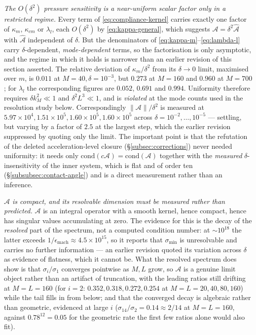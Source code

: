 \emph{The $O(\delta^2)$ pressure sensitivity is a near-uniform scalar factor only in a restricted regime.} Every term of \eqref{eq:compliance-kernel} carries exactly one factor of $\kappa_m$, $\kappa_{cm}$ or $\lambda_l$, each $O(\delta^2)$ by \eqref{eq:kappa-general}, which suggests $\mathcal A=\delta^2\widehat{\mathcal A}$ with $\widehat{\mathcal A}$ independent of $\delta$. But the denominators of \eqref{eq:kappa-m}--\eqref{eq:lambda-l} carry $\delta$-dependent, \emph{mode-dependent} terms, so the factorisation is only asymptotic, and the regime in which it holds is narrower than an earlier revision of this section asserted. The relative deviation of $\kappa_m/\delta^2$ from its $\delta\to0$ limit, maximised over $m$, is $0.011$ at $M=40,\delta=10^{-3}$, but $0.273$ at $M=160$ and $0.960$ at $M=700$; for $\lambda_l$ the corresponding figures are $0.052$, $0.691$ and $0.994$. Uniformity therefore requires $\delta k_M^2\ll1$ and $\delta^2L^3\ll1$, and is \emph{violated} at the mode counts used in the resolution study below. Correspondingly $\|\mathcal A\|/\delta^2$ is measured at $5.97\times10^4,1.51\times10^5,1.60\times10^5,1.60\times10^5$ across $\delta=10^{-2},\dots,10^{-5}$ --- settling, but varying by a factor of $2.5$ at the largest step, which the earlier revision suppressed by quoting only the limit. The important point is that the refutation of the deleted acceleration-level closure (\S\ref{subsec:corrections}) never needed uniformity: it needs only $\mathrm{cond}(c\mathcal A)=\mathrm{cond}(\mathcal A)$ together with the \emph{measured} $\delta$-insensitivity of the inner system, which is flat and of order ten (\S\ref{subsubsec:contact-angle}) and is a direct measurement rather than an inference.

\emph{$\mathcal A$ is compact, and its resolvable dimension must be measured rather than predicted.} $\mathcal A$ is an integral operator with a smooth kernel, hence compact, hence has singular values accumulating at zero. The evidence for this is the decay of the \emph{resolved} part of the spectrum, not a computed condition number: at $\sim10^{18}$ the latter exceeds $1/\epsilon_{\text{mach}}\approx4.5\times10^{15}$, so it reports that $\sigma_{\min}$ is unresolvable and carries no further information --- an earlier revision quoted its variation across $\delta$ as evidence of flatness, which it cannot be. What the resolved spectrum does show is that $\sigma_i/\sigma_1$ converges pointwise as $M,L$ grow, so $\mathcal A$ is a genuine limit object rather than an artifact of truncation, with the leading ratios still drifting at $M=L=160$ (for $i=2$: $0.352,0.318,0.272,0.254$ at $M=L=20,40,80,160$) while the tail fills in from below; and that the converged decay is algebraic rather than geometric, evidenced at large $i$ ($\sigma_{14}/\sigma_2=0.14\approx2/14$ at $M=L=160$, against $0.78^{12}=0.05$ for the geometric rate the first few ratios alone would also fit).

